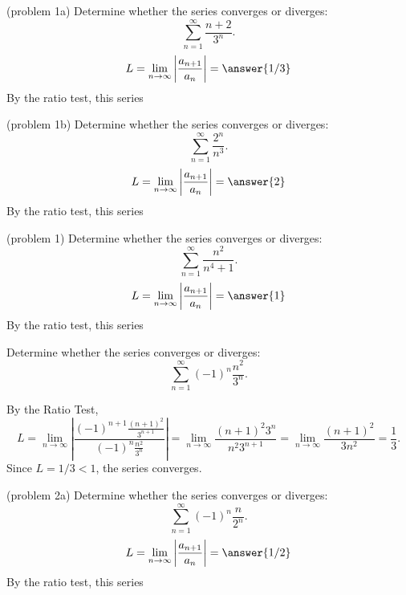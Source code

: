 \documentclass{ximera}
\begin{document}
\begin{problem}(problem 1a)
Determine whether the series converges or diverges:
\[
\sum_{n=1}^\infty \frac{n+2}{3^n}.
\]
\[
L = \lim_{n \to \infty} \left|\frac{a_{n+1}}{a_n}\right| = \answer{1/3}
\]
By the ratio test, this series 

\end{problem}


\begin{problem}(problem 1b)
Determine whether the series converges or diverges:
\[
\sum_{n=1}^\infty \frac{2^n}{n^3}.
\]
\[
L = \lim_{n \to \infty} \left|\frac{a_{n+1}}{a_n}\right| = \answer{2}
\]
By the ratio test, this series 

\end{problem}



\begin{problem}(problem 1)
Determine whether the series converges or diverges:
\[
\sum_{n=1}^\infty \frac{n^2}{n^4 +1}.
\]
\[
L = \lim_{n \to \infty} \left|\frac{a_{n+1}}{a_n}\right| = \answer{1}
\]
By the ratio test, this series 

\end{problem}


\begin{example}[example 2]
Determine whether the series converges or diverges:
\[
\sum_{n=1}^\infty (-1)^n\frac{n^2}{3^n}.
\]

By the Ratio Test,
\[
L =  \lim_{n \to \infty} \left|\frac{(-1)^{n+1}\frac{(n+1)^2}{3^{n+1}}}{(-1)^n\frac{n^2}{3^n}}\right| =  \lim_{n \to \infty} \frac{(n+1)^2 3^n}{n^2 3^{n+1}} 
=  \lim_{n \to \infty} \frac{(n+1)^2}{3n^2} = \frac13.
\]
Since $L = 1/3 < 1$, the series converges.
\end{example}





\begin{problem}(problem 2a)
Determine whether the series converges or diverges:
\[
\sum_{n=1}^\infty (-1)^n\frac{n}{2^n}.
\]
\[
L = \lim_{n \to \infty} \left|\frac{a_{n+1}}{a_n}\right| = \answer{1/2}
\]
By the ratio test, this series 

\end{problem}
\end{document}
